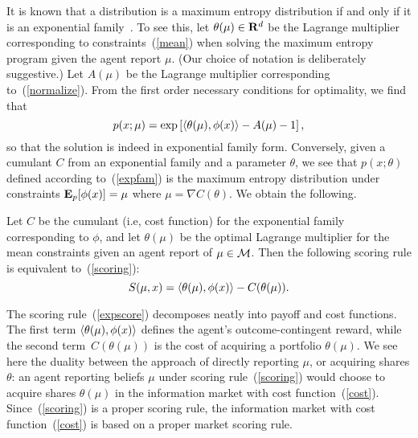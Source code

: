 It is known that a distribution is a maximum entropy distribution if and only if it is an exponential family~\cite{}. To see this, let $\theta(\mu) \in \mathbf{R}^d$ be the Lagrange multiplier corresponding to constraints~(\ref{mean}) when solving the maximum entropy program given the agent report $\mu$. (Our choice of notation is deliberately suggestive.) Let $A(\mu)$ be the Lagrange multiplier corresponding to~(\ref{normalize}). From the first order necessary conditions for optimality, we find that
%
\[ p(x;\mu) = \exp \left[ \langle \theta(\mu), \phi(x) \rangle - A(\mu) - 1 \right], \]
%
so that the solution is indeed in exponential family form. Conversely, given a cumulant $C$ from an exponential family and a parameter $\theta$, we see that $p(x;\theta)$ defined according to~(\ref{expfam}) is the maximum entropy distribution under constraints $\mathbf{E}_p[\phi(x)] = \mu$ where $\mu = \nabla C(\theta)$. We obtain the following.
%
\begin{proposition}
Let $C$ be the cumulant (i.e, cost function) for the exponential family corresponding to $\phi$, and let $\theta(\mu)$ be the optimal Lagrange multiplier for the mean constraints given an agent report of $\mu \in \mathcal{M}$. Then the following scoring rule is equivalent to~(\ref{scoring}):
%
\begin{equation} \label{expscore}
S(\mu, x) = \langle \theta(\mu), \phi(x) \rangle - C(\theta(\mu)).
\end{equation}
%
\end{proposition}
%
\noindent
The scoring rule~(\ref{expscore}) decomposes neatly into payoff and cost functions. The first term $\langle \theta(\mu), \phi(x) \rangle$ defines the agent's outcome-contingent reward, while the second term~$C(\theta(\mu))$ is the cost of acquiring a portfolio $\theta(\mu)$. We see here the duality between the approach of directly reporting $\mu$, or acquiring shares $\theta$: an agent reporting beliefs $\mu$ under scoring rule~(\ref{scoring}) would choose to acquire shares $\theta(\mu)$ in the information market with cost function~(\ref{cost}). Since~(\ref{scoring}) is a proper scoring rule, the information market with cost function~(\ref{cost}) is based on a proper market scoring rule.


